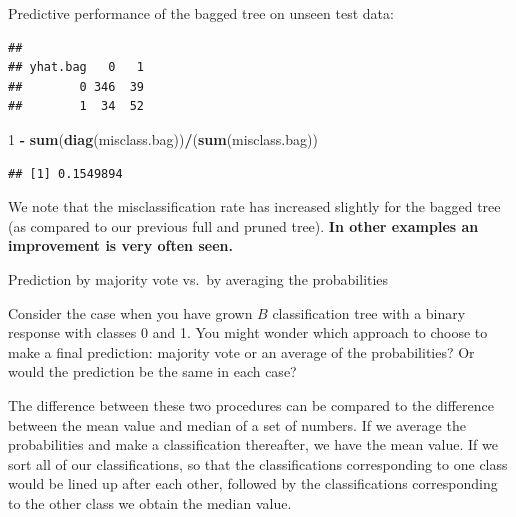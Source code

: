 \documentclass[10pt,ignorenonframetext,]{beamer}
\newenvironment{Shaded}{\begin{snugshade}}{\end{snugshade}}
\newcommand{\KeywordTok}[1]{\textcolor[rgb]{0.13,0.29,0.53}{\textbf{#1}}}
\newcommand{\DataTypeTok}[1]{\textcolor[rgb]{0.13,0.29,0.53}{#1}}
\newcommand{\DecValTok}[1]{\textcolor[rgb]{0.00,0.00,0.81}{#1}}
\newcommand{\StringTok}[1]{\textcolor[rgb]{0.31,0.60,0.02}{#1}}
\newcommand{\OperatorTok}[1]{\textcolor[rgb]{0.81,0.36,0.00}{\textbf{#1}}}
\newcommand{\NormalTok}[1]{#1}
\begin{document}
\begin{frame}[fragile]

Predictive performance of the bagged tree on unseen test data:

\begin{Shaded}
\end{Shaded}

\begin{verbatim}
##         
## yhat.bag   0   1
##        0 346  39
##        1  34  52
\end{verbatim}

\begin{Shaded}
\begin{Highlighting}[]
\DecValTok{1} \OperatorTok{-}\StringTok{ }\KeywordTok{sum}\NormalTok{(}\KeywordTok{diag}\NormalTok{(misclass.bag))}\OperatorTok{/}\NormalTok{(}\KeywordTok{sum}\NormalTok{(misclass.bag))}
\end{Highlighting}
\end{Shaded}

\begin{verbatim}
## [1] 0.1549894
\end{verbatim}

We note that the misclassification rate has increased slightly for the
bagged tree (as compared to our previous full and pruned tree).
\textbf{In other examples an improvement is very often seen.}

\end{frame}

\begin{frame}

\begin{block}{Prediction by majority vote vs.~by averaging the
probabilities}

Consider the case when you have grown \(B\) classification tree with a
binary response with classes 0 and 1. You might wonder which approach to
choose to make a final prediction: majority vote or an average of the
probabilities? Or would the prediction be the same in each case?

The difference between these two procedures can be compared to the
difference between the mean value and median of a set of numbers. If we
average the probabilities and make a classification thereafter, we have
the mean value. If we sort all of our classifications, so that the
classifications corresponding to one class would be lined up after each
other, followed by the classifications corresponding to the other class
we obtain the median value.

\end{block}

\end{frame}
\end{document}
